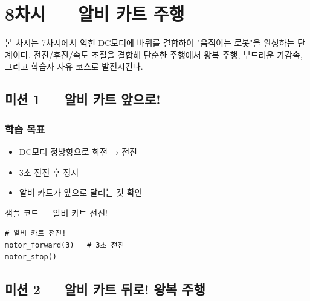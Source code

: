 \section{8차시 --- 알비 카트 주행}
\label{sec:ch08}

본 차시는 7차시에서 익힌 DC모터에 바퀴를 결합하여 "움직이는 로봇"을
완성하는 단계이다. 전진/후진/속도 조절을 결합해 단순한 주행에서
왕복 주행, 부드러운 가감속, 그리고 학습자 자유 코스로 발전시킨다.

\subsection{미션 1 --- 알비 카트 앞으로!}
\label{subsec:ch08-m1}

\begin{storybox}
\end{storybox}

\subsubsection*{학습 목표}
\begin{itemize}[leftmargin=1.4em]
  \item DC모터 정방향으로 회전 → 전진
  \item 3초 전진 후 정지
  \item 알비 카트가 앞으로 달리는 것 확인
\end{itemize}

\begin{labbox}{샘플 코드 --- 알비 카트 전진!}
\begin{verbatim}
# 알비 카트 전진!
motor_forward(3)   # 3초 전진
motor_stop()
\end{verbatim}
\end{labbox}

\subsection{미션 2 --- 알비 카트 뒤로! 왕복 주행}
\label{subsec:ch08-m2}

\begin{storybox}
\end{storybox}

